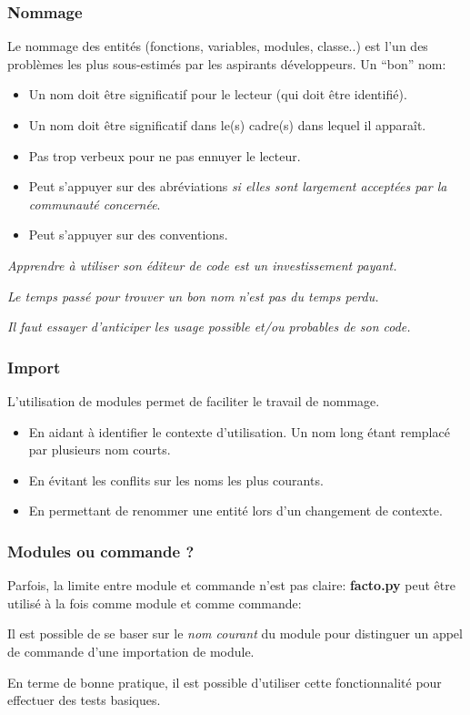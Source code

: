 \documentclass{beamer}
\begin{document}
\begin{frame}[fragile]\frametitle{Nommage}
  
  Le nommage des entités (fonctions, variables, modules, classe..) est l'un des problèmes les plus sous-estimés par les aspirants développeurs.\linebreak
  Un ``bon'' nom:
  \begin{itemize}
  \item Un nom doit être significatif pour le lecteur (qui doit être identifié).
  \item Un nom doit être significatif dans le(s) cadre(s) dans lequel il apparaît.
  \item Pas trop verbeux pour ne pas ennuyer le lecteur.
  \item Peut s'appuyer sur des abréviations {\em si elles sont largement acceptées par la communauté concernée}.
  \item Peut s'appuyer sur des conventions.
  \end{itemize}

  {\em Apprendre à utiliser son éditeur de code est un investissement payant.}

  {\em Le temps passé pour trouver un bon nom n'est pas du temps perdu.}

  {\em Il faut essayer d'anticiper les usage possible et/ou probables de son code.}
  
\end{frame}

\begin{frame}[fragile]\frametitle{Import}
  
  L'utilisation de modules permet de faciliter le travail de nommage.
  \begin{itemize}
  \item En aidant à identifier le contexte d'utilisation. Un nom long étant remplacé par plusieurs nom courts.
  \item En évitant les conflits sur les noms les plus courants.
  \item En permettant de renommer une entité lors d'un changement de contexte.
  \end{itemize}
  \fbox{}
  \fbox{}
\end{frame}

\begin{frame}[fragile]\frametitle{Modules ou commande ?}
  Parfois, la limite entre module et commande n'est pas claire: {\bf facto.py} peut être utilisé à la fois comme module et comme commande:

  Il est possible de se baser sur le {\em nom courant} du module pour distinguer un appel de commande d'une importation de module.

  \fbox{}

  En terme de bonne pratique, il est possible d'utiliser cette fonctionnalité pour effectuer des tests basiques.
  
\end{frame}
\end{document}
